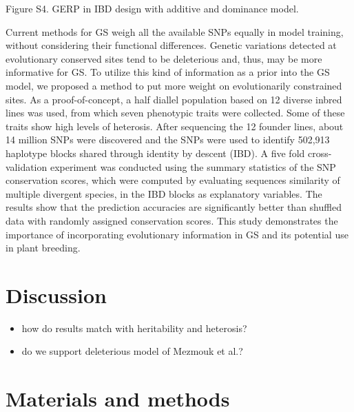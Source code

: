 \documentclass[10pt]{article}
\begin{document}
Figure S4. GERP in IBD design with additive and dominance model.




Current methods for GS weigh all the available SNPs equally in model training, without considering their functional differences. Genetic variations detected at evolutionary conserved sites tend to be deleterious and, thus, may be more informative for GS. To utilize this kind of information as a prior into the GS model, we proposed a method to put more weight on evolutionarily constrained sites. As a proof-of-concept, a half diallel population based on 12 diverse inbred lines was used, from which seven phenotypic traits were collected. Some of these traits show high levels of heterosis. After sequencing the 12 founder lines, about 14 million SNPs were discovered and the SNPs were used to identify 502,913 haplotype blocks shared through identity by descent (IBD). A five fold cross-validation experiment was conducted using the summary statistics of the SNP conservation scores, which were computed by evaluating sequences similarity of multiple divergent species, in the IBD blocks as explanatory variables. The results show that the prediction accuracies are significantly better than shuffled data with randomly assigned conservation scores. This study demonstrates the importance of incorporating evolutionary information in GS and its potential use in plant breeding.


\section*{Discussion}


\begin{itemize}
  \item how do results match with heritability and heterosis?
  \item do we support deleterious model of Mezmouk et al.?
\end{itemize}




\section*{Materials and methods}
\end{document}
